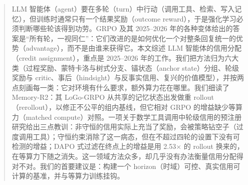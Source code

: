 \begin{abstract}
LLM 智能体（agent）要在多轮（turn）中行动（调用工具、检索、写入记忆），但训练时通常只有一个结果奖励（outcome reward），于是强化学习必须判断哪些轮该得到功劳。GRPO 及其 2025--2026 年的各种变体给出的答案是“所有轮，一视同仁”：它们改进的是如何优化一个对整条回复统一的优势（advantage），而不是由谁来获得它。本文综述 LLM 智能体的信用分配（credit assignment），重点是 2025--2026 年的工作。我们把方法归为六大类（过程奖励、蒙特卡洛与树式分支、锚状态（anchor state）分组、轮级奖励与 critic、事后（hindsight）与反事实信用、复兴的价值模型），并按两点刻画每一类：它对环境有什么要求，额外算力花在哪里。我们细读了 Memory-R2：其 LoGo-GRPO 从共享的记忆状态出发做重 rollout（rerollout），以修正不公平的组内基线，但它相对 GRPO 的增益缺少等算力（matched compute）对照。一项关于数学工具调用中轮级信用的预注册研究给出三点教训：非守恒的信用实际上充当了奖励，会被策略钻空子（过度调用工具）；守恒约束消除了这一病态，但在不超过四轮的设置下没有可检测的增益；DAPO 式过滤在终点上的增益是用 2.53$\times$ 的 rollout 换来的，在等算力下随之消失。这一领域方法众多，却几乎没有办法衡量信用分配得对不对。我们的首要建议是：构建一个 horizon（时域）可控、真实信用可计算的基准，并与等算力训练挂钩。
\end{abstract}

